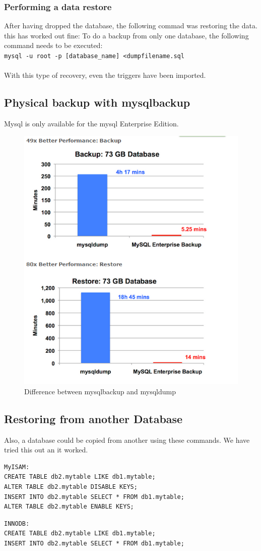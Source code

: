 \documentclass[10pt]{article}
\begin{document}
\subsubsection{Performing a data restore}
After having dropped the database, the following commad was restoring the data. this has worked out fine:
To do a backup from only one database, the following command needs to be executed: \\
\texttt{mysql -u root -p [database\_name] \textless dumpfilename.sql} \\ \\
With this type of recovery, even the triggers have been imported.
\newpage
\subsection{Physical backup with mysqlbackup}
Mysql is only available for the mysql Enterprise Edition.
\begin{figure}[!h]
	\begin{center}
		\includegraphics[width=0.7\linewidth]{pictures/mysqlentbackup}
		\caption{Difference between mysqlbackup and mysqldump \cite{mysqlenterprisebackup}}
		\label{differenceent}
	\end{center}
\end{figure}\FloatBarrier
\subsection{Restoring from another Database}
Also, a database could be copied from another using these commands.
We have tried this out an it worked.\cite{so1}
\begin{lstlisting}    
MyISAM:
CREATE TABLE db2.mytable LIKE db1.mytable;
ALTER TABLE db2.mytable DISABLE KEYS;
INSERT INTO db2.mytable SELECT * FROM db1.mytable;
ALTER TABLE db2.mytable ENABLE KEYS;
 \end{lstlisting}    
 \begin{lstlisting}    
INNODB:
CREATE TABLE db2.mytable LIKE db1.mytable;
INSERT INTO db2.mytable SELECT * FROM db1.mytable;
  \end{lstlisting}    
\end{document}
